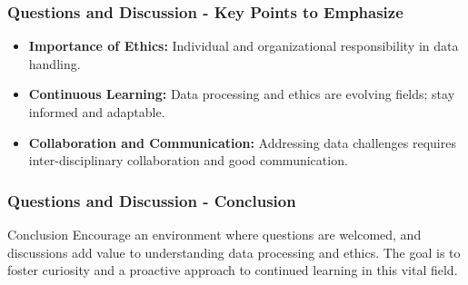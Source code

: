 \documentclass[aspectratio=169]{beamer}
\begin{document}
\begin{frame}[fragile]
    \frametitle{Questions and Discussion - Key Points to Emphasize}
    \begin{itemize}
        \item \textbf{Importance of Ethics:} Individual and organizational responsibility in data handling.
        \item \textbf{Continuous Learning:} Data processing and ethics are evolving fields; stay informed and adaptable.
        \item \textbf{Collaboration and Communication:} Addressing data challenges requires inter-disciplinary collaboration and good communication. 
    \end{itemize}
\end{frame}

\begin{frame}[fragile]
    \frametitle{Questions and Discussion - Conclusion}
    \begin{block}{Conclusion}
        Encourage an environment where questions are welcomed, and discussions add value to understanding data processing and ethics. The goal is to foster curiosity and a proactive approach to continued learning in this vital field.
    \end{block}
\end{frame}
\end{document}
